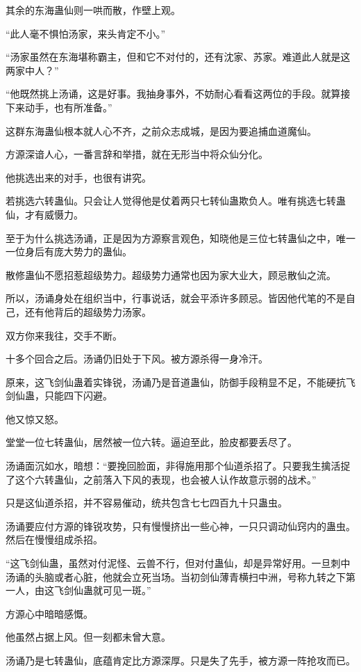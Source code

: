 \begin{this_body}
其余的东海蛊仙则一哄而散，作壁上观。

“此人毫不惧怕汤家，来头肯定不小。”

“汤家虽然在东海堪称霸主，但和它不对付的，还有沈家、苏家。难道此人就是这两家中人？”

“他既然挑上汤诵，这是好事。我抽身事外，不妨耐心看看这两位的手段。就算接下来动手，也有所准备。”

这群东海蛊仙根本就人心不齐，之前众志成城，是因为要追捕血道魔仙。

方源深谙人心，一番言辞和举措，就在无形当中将众仙分化。

他挑选出来的对手，也很有讲究。

若挑选六转蛊仙。只会让人觉得他是仗着两只七转仙蛊欺负人。唯有挑选七转蛊仙，才有威慑力。

至于为什么挑选汤诵，正是因为方源察言观色，知晓他是三位七转蛊仙之中，唯一一位身后有庞大势力的蛊仙。

散修蛊仙不愿招惹超级势力。超级势力通常也因为家大业大，顾忌散仙之流。

所以，汤诵身处在组织当中，行事说话，就会平添许多顾忌。皆因他代笔的不是自己，还有他背后的超级势力汤家。

双方你来我往，交手不断。

十多个回合之后。汤诵仍旧处于下风。被方源杀得一身冷汗。

原来，这飞剑仙蛊着实锋锐，汤诵乃是音道蛊仙，防御手段稍显不足，不能硬抗飞剑仙蛊，只能四下闪避。

他又惊又怒。

堂堂一位七转蛊仙，居然被一位六转。逼迫至此，脸皮都要丢尽了。

汤诵面沉如水，暗想：“要挽回脸面，非得施用那个仙道杀招了。只要我生擒活捉了这个六转蛊仙，之前落入下风的表现，也会被人认作故意示弱的战术。”

只是这仙道杀招，并不容易催动，统共包含七七四百九十只蛊虫。

汤诵要应付方源的锋锐攻势，只有慢慢挤出一些心神，一只只调动仙窍内的蛊虫。然后在慢慢组成杀招。

“这飞剑仙蛊，虽然对付泥怪、云兽不行，但对付蛊仙，却是异常好用。一旦刺中汤诵的头脑或者心脏，他就会立死当场。当初剑仙薄青横扫中洲，号称九转之下第一人，由这飞剑仙蛊就可见一斑。”

方源心中暗暗感慨。

他虽然占据上风。但一刻都未曾大意。

汤诵乃是七转蛊仙，底蕴肯定比方源深厚。只是失了先手，被方源一阵抢攻而已。


\end{this_body}
